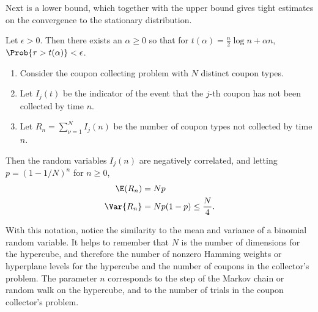 \documentclass[12pt]{article}
\begin{document}

Next is a lower bound, which together with the upper bound gives tight
estimates on the convergence to the stationary distribution.

\begin{theorem}
    Let \( \epsilon > 0 \).  Then there exists an \( \alpha \ge 0 \) so
    that for \( t(\alpha) = \frac{n}{2} \log n + \alpha n \), \( \Prob{\tau
    > t(\alpha)} < \epsilon \).
\end{theorem}

\begin{lemma}
    \label{thm:convergence:lem713}%
    \begin{enumerate}
        \item
            Consider the coupon collecting problem with \( N \) distinct
            coupon types.
        \item
            Let \( I_j(t) \) be the indicator of the event that the \( j
            \)-th coupon has not been collected by time \( n \).
        \item
            Let \( R_n = \sum_{\nu = 1}^N I_j(n) \) be the number of
            coupon types not collected by time \( n \).
    \end{enumerate}
    Then the random variables \( I_j(n) \) are negatively correlated,
    and letting \( p =(1 - 1/N)^n \) for \( n \ge 0 \),
    \begin{align*}
        \E(R_n) &= N p \\
        \Var{R_n} &= N p (1- p) \le \frac{N}{4}.
    \end{align*}
\end{lemma}

\begin{remark}
    With this notation, notice the similarity to the mean and variance
    of a binomial random variable.  It helps to remember that \( N \) is
    the number of dimensions for the hypercube, and therefore the number
    of nonzero Hamming weights or hyperplane levels for the hypercube
    and the number of coupons in the collector's problem. The parameter \(
    n \) corresponds to the step of the Markov chain or random walk on
    the hypercube, and to the number of trials in the coupon collector's
    problem.
\end{remark}
\end{document}
